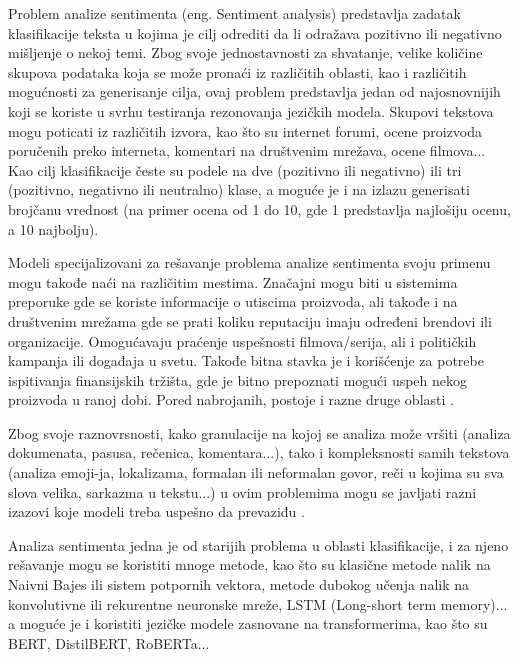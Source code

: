 \documentclass[12pt,oneside]{memoir}
\begin{document}
Problem analize sentimenta (eng. Sentiment analysis) predstavlja zadatak klasifikacije teksta u kojima je cilj odrediti da li odražava pozitivno ili negativno mišljenje o nekoj temi. Zbog svoje jednostavnosti za shvatanje, velike količine skupova podataka koja se može pronaći iz različitih oblasti, kao i različitih mogućnosti za generisanje cilja, ovaj problem predstavlja jedan od najosnovnijih koji se koriste u svrhu testiranja rezonovanja jezičkih modela. Skupovi tekstova mogu poticati iz različitih izvora, kao što su internet forumi, ocene proizvoda poručenih preko interneta, komentari na društvenim mrežava, ocene filmova... Kao cilj klasifikacije česte su podele na dve (pozitivno ili negativno) ili  tri (pozitivno, negativno ili neutralno) klase, a moguće je i na izlazu generisati brojčanu vrednost (na primer ocena od 1 do 10, gde 1 predstavlja najlošiju ocenu, a 10 najbolju).

Modeli specijalizovani za rešavanje problema analize sentimenta svoju primenu mogu takođe naći na različitim mestima. Značajni mogu biti u sistemima preporuke gde se koriste informacije o utiscima  proizvoda, ali takođe i na društvenim mrežama gde se prati koliku reputaciju imaju određeni brendovi ili organizacije. Omogućavaju praćenje uspešnosti filmova/serija, ali i političkih kampanja ili događaja u svetu. Takođe bitna stavka je i korišćenje za potrebe ispitivanja finansijskih tržišta, gde je bitno prepoznati mogući uspeh nekog proizvoda u ranoj dobi. Pored nabrojanih, postoje i razne druge oblasti \cite{SentimentAnalysisApplication}.

Zbog svoje raznovrsnosti, kako granulacije na kojoj se analiza može vršiti (analiza dokumenata, pasusa, rečenica, komentara...)\cite{SentimentAnalysisGranularity}, tako i kompleksnosti samih tekstova (analiza emoji-ja, lokalizama, formalan ili neformalan govor, reči u kojima su sva slova velika, sarkazma u tekstu...) u ovim problemima mogu se javljati razni izazovi koje modeli treba uspešno da prevaziđu \cite{SentimentAnalysisChallenges}.

Analiza sentimenta jedna je od starijih problema u oblasti klasifikacije, i za njeno rešavanje mogu se koristiti mnoge metode, kao što su klasične metode nalik na Naivni Bajes\cite{SANaiveBayes} ili sistem potpornih vektora\cite{SASVM}, metode dubokog učenja nalik na konvolutivne\cite{SAConvolutional} ili rekurentne neuronske mreže\cite{SARecurrent}, LSTM (Long-short term memory)\cite{SALSTM}... a moguće je i koristiti jezičke modele zasnovane na transformerima, kao što su BERT, DistilBERT, RoBERTa...
\end{document}
